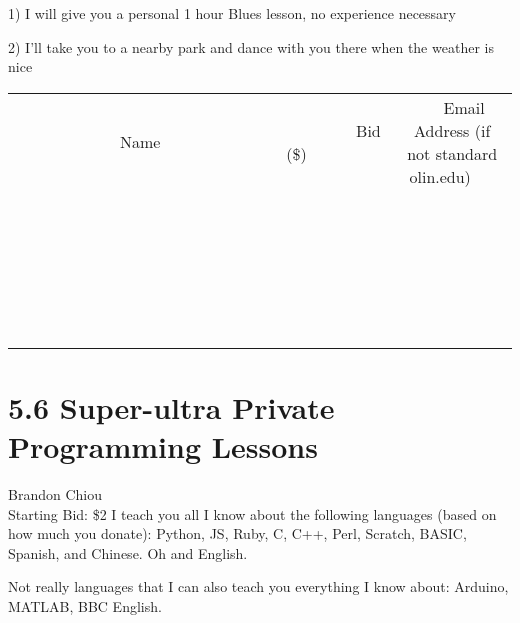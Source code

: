\documentclass[11pt]{article}
\begin{document}
1) I will give you a personal 1 hour Blues lesson, no experience necessary

2) I'll take you to a nearby park and dance with you there when the weather is nice
\\[6ex]
\begin{tabular}{c c c}
~~~~~~~~~~~~~Name~~~~~~~~~~~~~ & ~~~~~~~~~Bid (\$)~~~~~~~~~  & ~~~Email Address (if not standard olin.edu)~~~\\
 & & \\
\hline
 & & \\
\hline
 & & \\
\hline
 & & \\
\hline
 & & \\
\hline
 & & \\
\hline
 & & \\
\hline
 & & \\
\hline
 & & \\
\hline
 & & \\
\hline
 & & \\
\hline
 & & \\
\hline
 & & \\
\hline
 & & \\
\hline
 & & \\
\hline
 & & \\
\hline
 & & \\
\hline
 & & \\
\hline
 & & \\
\hline
 & & \\
\hline
 & & \\
\hline
 & & \\
\hline
 & & \\
\hline
 & & \\
\hline
 & & \\
\hline
 & & \\
\hline
\end{tabular}
\newpage
\section*{5.6 Super-ultra Private Programming Lessons}
Brandon Chiou
\\
Starting Bid: \$2
\newline
I teach you all I know about the following languages (based on how much you donate): Python, JS, Ruby, C, C++, Perl, Scratch, BASIC, Spanish, and Chinese. Oh and English.

Not really languages that I can also teach you everything I know about: Arduino, MATLAB, BBC English.
\end{document}
